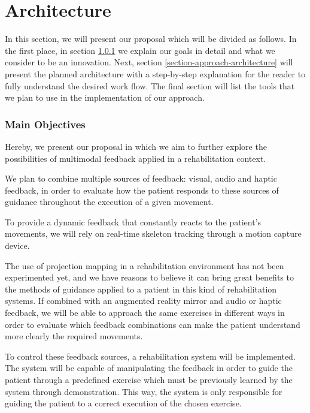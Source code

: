 \chapter{Architecture}
\label{sec:Architecture}
 
In this section, we will present our proposal which will be divided as follows. 
In the first place, in section \ref{section-approach-main-objectives} we explain
our goals in detail and what we consider to be an innovation. 
Next, section \ref{section-approach-architecture} will present the planned architecture with a step-by-step 
explanation for the reader to fully understand the desired work flow.
The final section will list the tools that we plan to use in the implementation of our approach.

\subsection{Main Objectives}
\label{section-approach-main-objectives}

Hereby, we present our proposal in which we aim to further explore the possibilities of multimodal 
feedback applied in a rehabilitation context.

We plan to combine multiple sources of feedback: visual, audio and haptic feedback, 
in order to evaluate how the patient responds to these sources of 
guidance throughout the execution of a given movement. 

To provide a dynamic feedback that constantly reacts to the patient's movements, we will rely on real-time skeleton tracking through a motion capture device.

The use of projection mapping in a rehabilitation environment has not been experimented yet, 
and we have reasons to believe it can bring great benefits to the methods of guidance 
applied to a patient in this kind of rehabilitation systems. If combined with an augmented reality mirror 
and audio or haptic feedback, we will be able to approach the same exercises in different ways in order to evaluate which 
feedback combinations can make the patient understand more clearly the required movements.

To control these feedback sources, a rehabilitation system will be implemented.%
The system will be capable of manipulating the feedback in order to guide
the patient through a predefined exercise which must be previously learned by the system through demonstration.
This way, the system is only responsible for guiding the patient to a correct execution of the chosen exercise.

